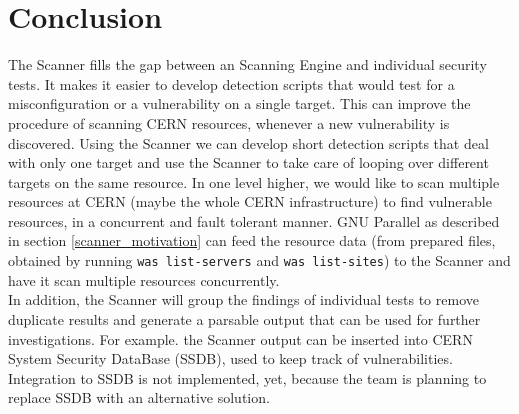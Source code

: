 \section{Conclusion}
The Scanner fills the gap between an Scanning Engine and individual security tests. It makes it easier to develop detection scripts that would test for a misconfiguration or a vulnerability on a single target. This can improve the procedure of scanning CERN resources, whenever a new vulnerability is discovered. Using the Scanner we can develop short detection scripts that deal with only one target and use the Scanner to take care of looping over different targets on the same resource. In one level higher, we would like to scan multiple resources at CERN (maybe the whole CERN infrastructure) to find vulnerable resources, in a concurrent and fault tolerant manner. GNU Parallel as described in section \ref{scanner_motivation} can feed the resource data (from prepared files, obtained by running \texttt{was list-servers} and \texttt{was list-sites}) to the Scanner and have it scan multiple resources concurrently.
\\
In addition, the Scanner will group the findings of individual tests to remove duplicate results and generate a parsable output that can be used for further investigations. For example. the Scanner output can be inserted into CERN System Security DataBase (SSDB), used to keep track of vulnerabilities. Integration to SSDB is not implemented, yet, because the team is planning to replace SSDB with an alternative solution. 

